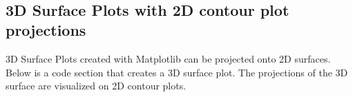 \documentclass{book}
\begin{document}
    \begin{center}
    \end{center}
    { \hspace*{\fill} \\}
    

    
        \hypertarget{d-surface-plots-with-2d-contour-plot-projections}{%
\subsection{3D Surface Plots with 2D contour plot
projections}\label{d-surface-plots-with-2d-contour-plot-projections}}
    




    
        3D Surface Plots created with Matplotlib can be projected onto 2D
surfaces. Below is a code section that creates a 3D surface plot. The
projections of the 3D surface are visualized on 2D contour plots.
    
\end{document}
